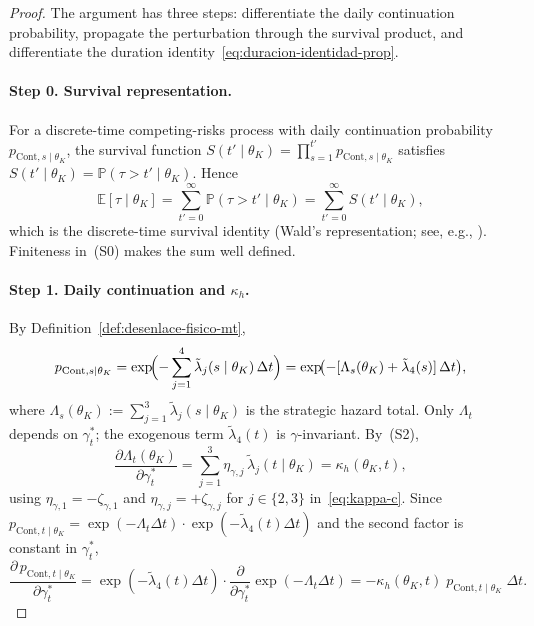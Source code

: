 \documentclass[12pt]{article}
\numberwithin{equation}{section}
\numberwithin{table}{section}
\theoremstyle{definition}
\newcommand{\Prob}{\mathbb{P}}
\begin{document}
\begin{proof}
The argument has three steps: differentiate the daily continuation probability,
propagate the perturbation through the survival product, and differentiate the
duration identity~\eqref{eq:duracion-identidad-prop}.

\paragraph{Step 0. Survival representation.}
For a discrete-time competing-risks process with daily continuation probability
$p_{\mathrm{Cont},s\mid\theta_K}$, the survival function
$S(t'\mid\theta_K)=\prod_{s=1}^{t'}p_{\mathrm{Cont},s\mid\theta_K}$ satisfies
$S(t'\mid\theta_K)=\Prob(\tau>t'\mid\theta_K)$. Hence
\[
\mathbb{E}[\tau\mid\theta_K]
=\sum_{t'=0}^{\infty}\Prob(\tau>t'\mid\theta_K)
=\sum_{t'=0}^{\infty}S(t'\mid\theta_K),
\]
which is the discrete-time survival identity (Wald's representation; see, e.g.,
\citet{KalbfleischPrentice2002}). Finiteness in~\textup{(S0)} makes the sum
well defined.

\paragraph{Step 1. Daily continuation and $\kappa_h$.}
By Definition~\ref{def:desenlace-fisico-mt},
\[
p_{\mathrm{Cont},s\mid\theta_K}
=\exp\!\Bigl(-\sum_{j=1}^{4}\tilde\lambda_j(s\mid\theta_K)\,\Delta t\Bigr)
=\exp\!\bigl(-[\Lambda_s(\theta_K)+\tilde\lambda_4(s)]\,\Delta t\bigr),
\]
where $\Lambda_s(\theta_K):=\sum_{j=1}^{3}\tilde\lambda_j(s\mid\theta_K)$ is the
strategic hazard total. Only $\Lambda_t$ depends on $\gamma_t^\ast$; the
exogenous term $\tilde\lambda_4(t)$ is $\gamma$-invariant. By~\textup{(S2)},
\[
\frac{\partial\Lambda_t(\theta_K)}{\partial\gamma_t^\ast}
=\sum_{j=1}^{3}\eta_{\gamma,j}\,\tilde\lambda_j(t\mid\theta_K)
=\kappa_h(\theta_K,t),
\]
using $\eta_{\gamma,1}=-\zeta_{\gamma,1}$ and $\eta_{\gamma,j}=+\zeta_{\gamma,j}$
for $j\in\{2,3\}$ in~\eqref{eq:kappa-c}. Since
$p_{\mathrm{Cont},t\mid\theta_K}=\exp(-\Lambda_t\Delta t)\cdot
\exp(-\tilde\lambda_4(t)\Delta t)$ and the second factor is constant in
$\gamma_t^\ast$,
\begin{equation}
\label{eq:dpCont-dgamma}
\frac{\partial\,p_{\mathrm{Cont},t\mid\theta_K}}{\partial\gamma_t^\ast}
=\exp(-\tilde\lambda_4(t)\Delta t)\cdot
\frac{\partial}{\partial\gamma_t^\ast}\exp(-\Lambda_t\Delta t)
=-\kappa_h(\theta_K,t)\;p_{\mathrm{Cont},t\mid\theta_K}\;\Delta t.
\end{equation}


\end{proof}
\end{document}
